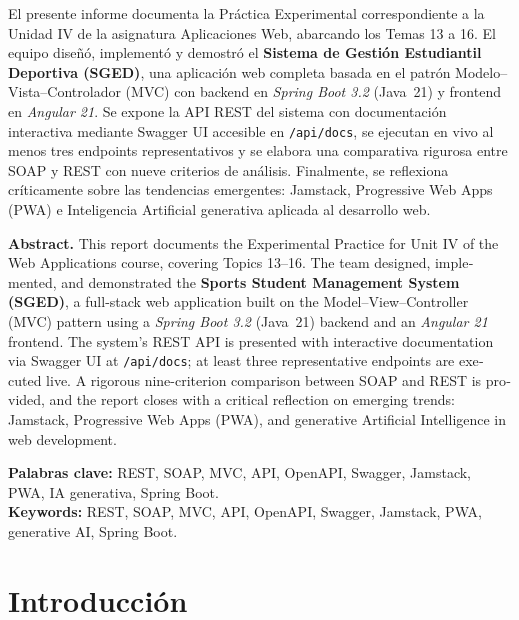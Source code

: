 \documentclass[12pt,a4paper]{article}
\begin{document}
\noindent
El presente informe documenta la Práctica Experimental correspondiente a la Unidad IV de la
asignatura Aplicaciones Web, abarcando los Temas 13 a 16.
El equipo diseñó, implementó y demostró el \textbf{Sistema de Gestión Estudiantil Deportiva (SGED)},
una aplicación web completa basada en el patrón Modelo--Vista--Controlador (MVC) con backend en
\textit{Spring Boot 3.2} (Java~21) y frontend en \textit{Angular 21}.
Se expone la API REST del sistema con documentación interactiva mediante Swagger UI accesible en
\texttt{/api/docs}, se ejecutan en vivo al menos tres endpoints representativos y se elabora una
comparativa rigurosa entre SOAP y REST con nueve criterios de análisis.
Finalmente, se reflexiona críticamente sobre las tendencias emergentes: Jamstack,
Progressive Web Apps (PWA) e Inteligencia Artificial generativa aplicada al desarrollo web.

\bigskip

\begin{otherlanguage}{english}
\noindent\textbf{Abstract.}
This report documents the Experimental Practice for Unit IV of the Web Applications course,
covering Topics 13--16.
The team designed, implemented, and demonstrated the \textbf{Sports Student Management System (SGED)},
a full-stack web application built on the Model--View--Controller (MVC) pattern using a
\textit{Spring Boot 3.2} (Java~21) backend and an \textit{Angular 21} frontend.
The system's REST API is presented with interactive documentation via Swagger UI at \texttt{/api/docs};
at least three representative endpoints are executed live.
A rigorous nine-criterion comparison between SOAP and REST is provided, and the report closes with a
critical reflection on emerging trends: Jamstack, Progressive Web Apps (PWA), and generative
Artificial Intelligence in web development.
\end{otherlanguage}

\bigskip
\noindent\textbf{Palabras clave:} REST, SOAP, MVC, API, OpenAPI, Swagger, Jamstack, PWA,
IA generativa, Spring Boot.\\
\textbf{Keywords:} REST, SOAP, MVC, API, OpenAPI, Swagger, Jamstack, PWA, generative AI,
Spring Boot.

\newpage
\tableofcontents
\newpage

\section{Introducción}
\end{document}
